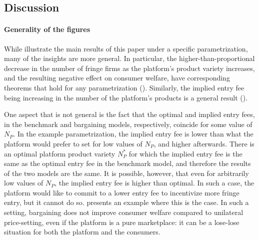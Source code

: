 \documentclass[a4paper]{article}
\begin{document}
\subsection{Discussion}
\label{sec:results_discussion}

\paragraph{Generality of the figures}
While  illustrate the main results of this paper under a specific parametrization, many of the insights are more general.
In particular, the higher-than-proportional decrease in the number of fringe firms as the platform's product variety increases, and the resulting negative effect on consumer welfare, have corresponding theorems that hold for any parametrization ().
Similarly, the implied entry fee being increasing in the number of the platform's products is a general result ().

One aspect that is not general is the fact that the optimal and implied entry fees, in the benchmark and bargaining models, respectively, coincide for some value of $N_P$.
In the example parametrization, the implied entry fee is lower than what the platform would prefer to set for low values of $N_P$, and higher afterwards.
There is an optimal platform product variety $N_P^*$ for which the implied entry fee is the same as the optimal entry fee in the benchmark model, and therefore the results of the two models are the same.
It is possible, however, that even for arbitrarily low values of $N_P$, the implied entry fee is higher than optimal.
In such a case, the platform would like to commit to a lower entry fee to incentivize more fringe entry, but it cannot do so.
 presents an example where this is the case.
In such a setting, bargaining does not improve consumer welfare compared to unilateral price-setting, even if the platform is a pure marketplace: it can be a lose-lose situation for both the platform and the consumers.
\end{document}
